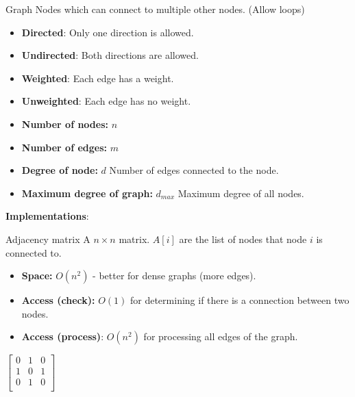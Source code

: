 \begin{definition}
    {Graph}
    Nodes which can connect to multiple other nodes. (Allow loops)
    \begin{itemize}
        \item \textbf{Directed}: Only one direction is allowed.
        \item \textbf{Undirected}: Both directions are allowed.
    \end{itemize}
    \begin{itemize}
        \item \textbf{Weighted}: Each edge has a weight.
        \item \textbf{Unweighted}: Each edge has no weight.
    \end{itemize}
    \begin{itemize}
        \item \textbf{Number of nodes:} $n$
        \item \textbf{Number of edges:} $m$
        \item \textbf{Degree of node:} $d$ Number of edges connected to the node.
        \item \textbf{Maximum degree of graph:} $d_{max}$ Maximum degree of all nodes.
    \end{itemize}
\end{definition}

\textbf{Implementations}:

\begin{theorem}
    {Adjacency matrix}
    A $n \times n$ matrix. $A[i]$ are the list of nodes that node $i$ is connected to.

    \begin{itemize}
        \item \textbf{Space:} $O(n^2)$ - better for dense graphs (more edges).
        \item \textbf{Access (check):} $O(1)$ for determining if there is a connection between two nodes.
        \item \textbf{Access (process)}: $O(n^2)$ for processing all edges of the graph.
    \end{itemize}

    \tcblower

    \begin{center}
        \hspace{1cm}
        $
            \begin{bmatrix}
                0 & 1 & 0 \\
                1 & 0 & 1 \\
                0 & 1 & 0 \\
            \end{bmatrix}
        $
    \end{center}

\end{theorem}

